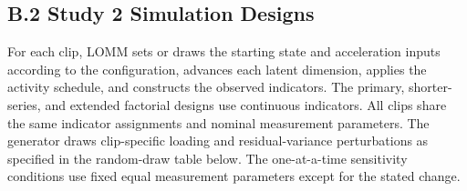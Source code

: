 \documentclass[
]{article}
\begin{document}
\subsection{B.2 Study 2 Simulation
Designs}\label{b.2-study-2-simulation-designs}

For each clip, LOMM sets or draws the starting state and acceleration
inputs according to the configuration, advances each latent dimension,
applies the activity schedule, and constructs the observed indicators.
The primary, shorter-series, and extended factorial designs use
continuous indicators. All clips share the same indicator assignments
and nominal measurement parameters. The generator draws clip-specific
loading and residual-variance perturbations as specified in the
random-draw table below. The one-at-a-time sensitivity conditions use
fixed equal measurement parameters except for the stated change.

\begin{table}[H]

\caption{\label{tbl-scenario-families}The six Study 2 scenario families.
Dwell values are fractions of the number of observations per clip.}


\end{table}%
\end{document}
